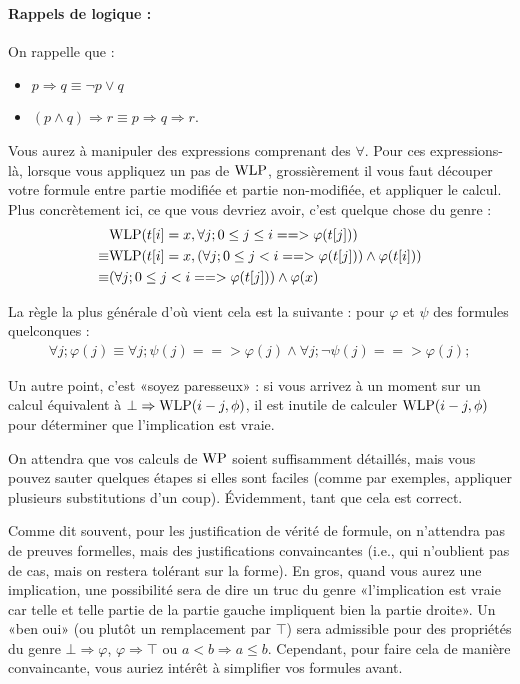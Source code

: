 \documentclass[11pt,answers]{exam}
\begin{document}
\paragraph{Rappels de logique :}

On rappelle que :
\begin{itemize}
    \item $p \Rightarrow q \equiv \neg p \vee q$
    \item $(p \wedge q) \Rightarrow r \equiv p \Rightarrow q \Rightarrow r$.
\end{itemize}

Vous aurez à manipuler des expressions comprenant des $\forall$. Pour ces expressions-là, lorsque vous appliquez un pas de $\mathrm{WLP}$, grossièrement il vous faut découper votre formule entre partie modifiée et partie non-modifiée, et appliquer le calcul. Plus concrètement ici, ce que vous devriez avoir, c’est quelque chose du genre :
\begin{align*}
    & \mathrm{WLP}(t[i] = x,\forall j; 0 \leq j \leq i ==> \varphi(t[j]))\\
    \equiv & \mathrm{WLP}(t[i] = x,(\forall j; 0 \leq j < i ==> \varphi(t[j])) \wedge \varphi(t[i]))\\
    \equiv & (\forall j; 0 \leq j < i ==> \varphi(t[j])) \wedge \varphi(x)
\end{align*}

La règle la plus générale d’où vient cela est la suivante : pour $\varphi$ et $\psi$ des formules quelconques :
\begin{align*}
    \forall j; \varphi(j) \equiv \forall j; \psi(j) ==> \varphi(j) \wedge \forall j; \neg \psi(j) ==> \varphi(j);
\end{align*}

Un autre point, c’est «soyez paresseux» : si vous arrivez à un moment sur un calcul équivalent à $\bot \Rightarrow \mathrm{WLP}(i-j,\phi)$, il est inutile de calculer $\mathrm{WLP}(i-j,\phi)$ pour déterminer que l’implication est vraie.

On attendra que vos calculs de $\mathrm{WP}$ soient suffisamment détaillés, mais vous pouvez sauter quelques étapes si elles sont faciles (comme par exemples, appliquer plusieurs substitutions d’un coup). Évidemment, tant que cela est correct.

Comme dit souvent, pour les justification de vérité de formule, on n’attendra pas de preuves formelles, mais des justifications convaincantes (i.e., qui n’oublient pas de cas, mais on restera tolérant sur la forme).
En gros, quand vous aurez une implication, une possibilité sera de dire un truc du genre «l’implication est vraie car telle et telle partie de la partie gauche impliquent bien la partie droite».
Un «ben oui» (ou plutôt un remplacement par $\top$) sera admissible pour des propriétés du genre $\bot \Rightarrow \varphi$, $\varphi \Rightarrow \top$ ou $a < b \Rightarrow a \leq b$.
Cependant, pour faire cela de manière convaincante, vous auriez intérêt à simplifier vos formules avant.
\end{document}
